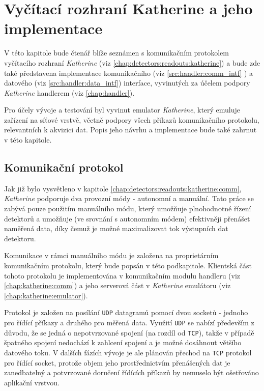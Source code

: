 

\chapter{Vyčítací rozhraní Katherine a jeho implementace}\label{chap:katherine}
V této kapitole bude čtenář blíže seznámen s komunikačním protokolem vyčítacího rozhraní \textit{Katherine} (viz \ref{chap:detectors:readouts:katherine}) a bude zde také představena implementace komunikačního (viz \ref{src:handler:comm_intf} ) a datového (viz \ref{src:handler:data_intf}) interface, vyvinutých za účelem podpory \textit{Katherine} handlerem (viz \ref{chap:handler}). 

Pro účely vývoje a testování byl vyvinut emulator \textit{Katherine}, který emuluje zařízení na síťové vrstvě, včetně podpory všech příkazů komunikačního protokolu, relevantních k akvizici dat. Popis jeho návrhu a implementace bude také zahrnut v této kapitole.

\section{Komunikační protokol}\label{chap:katherine:protocol}
Jak již bylo vysvětleno v kapitole \ref{chap:detectors:readouts:katherine:comm}, \textit{Katherine} podporuje dva provozní módy - autonomní a manuální. Tato práce se zabývá pouze použitím manuálního módu, který umožňuje plnohodnotné řízení detektorů a umožňuje (ve srovnání s autonomním módem) efektivněji přenášet naměřená data, díky čemuž je možné maximalizovat tok výstupních dat detektoru.

Komunikace v rámci manuálního módu je založena na proprietárním komunikačním protokolu, který bude popsán v této podkapitole. Klientská část tohoto protokolu je implementována v komunikačním modulu handleru (viz \ref{chap:katherine:comm}) a jeho serverová část v \textit{Katherine} emulátoru (viz \ref{chap:katherine:emulator}).

Protokol je založen na posílání \texttt{UDP} datagramů pomocí dvou socketů - jednoho pro řídící příkazy a druhého pro měřená data. Využití \texttt{UDP} se nabízí především z důvodu, že se jedná o nepotvrzované spojení (na rozdíl od \texttt{TCP}), takže v případě špatného spojení nedochází k zahlcení spojení a je možné dosáhnout většího datového toku. V dalších fázích vývoje je ale plánován přechod na \texttt{TCP} protokol pro řídící socket, protože objem jeho prostřednictvím přenášených dat je zanedbatelný a potvrzované doručení řídících příkazů by nemuselo být ošetřováno aplikační vrstvou.

